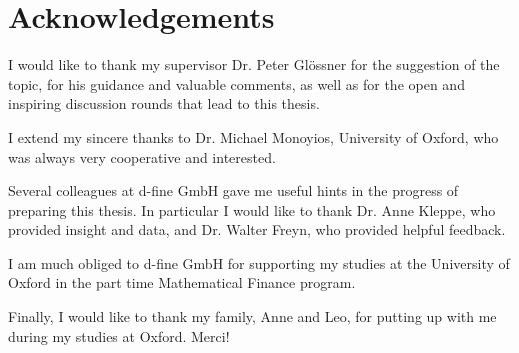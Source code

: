 \chapter*{Acknowledgements} %
\label{cha:acknowledgements}


I would like to thank my supervisor Dr. Peter Gl\"ossner for the suggestion of the topic, for his guidance and valuable comments, as well as for the open and inspiring discussion rounds that lead to this thesis.

I extend my sincere thanks to Dr. Michael Monoyios, University of Oxford, who was always very cooperative and interested.

Several colleagues at d-fine GmbH gave me useful hints in the progress of preparing this thesis.
In particular I would like to thank Dr. Anne Kleppe, who provided insight and data, and Dr. Walter Freyn, who provided helpful feedback.

I am much obliged to d-fine GmbH for supporting my studies at the University of Oxford in the part time Mathematical Finance program.

Finally, I would like to thank my family, Anne and Leo, for putting up with me during my studies at Oxford. Merci!


